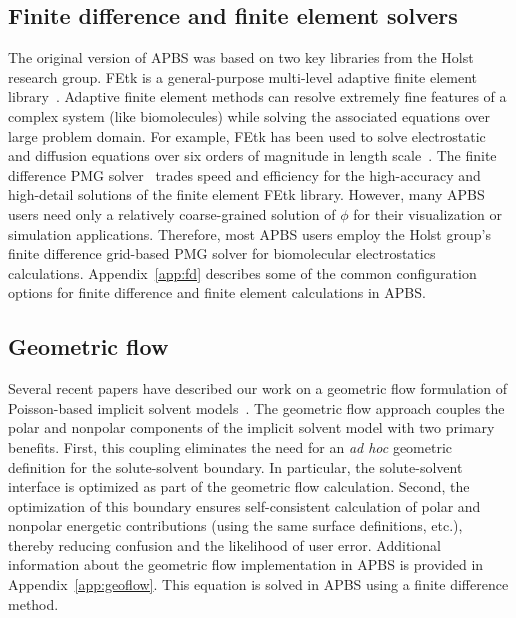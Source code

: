 \documentclass[12pt,titlepage]{article}
\begin{document}
\subsection{Finite difference and finite element solvers} \label{sec:fd}
The original version of APBS was based on two key libraries from the Holst research group.
FEtk is a general-purpose multi-level adaptive finite element library~\cite{FEtk, FEtkweb}.
Adaptive finite element methods can resolve extremely fine features of a complex system (like biomolecules) while solving the associated equations over large problem domain.
For example, FEtk has been used to solve electrostatic and diffusion equations over six orders of magnitude in length scale~\cite{Tai2003}.
The finite difference PMG solver~\cite{FEtkweb, Holst1993} trades speed and efficiency for the high-accuracy and high-detail solutions of the finite element FEtk library.
However, many APBS users need only a relatively coarse-grained solution of $\phi$ for their visualization or simulation applications.
Therefore, most APBS users employ the Holst group's finite difference grid-based PMG solver for biomolecular electrostatics calculations.
Appendix~\ref{app:fd} describes some of the common configuration options for finite difference and finite element calculations in APBS.

\subsection{Geometric flow} \label{sec:geoflow}
Several recent papers have described our work on a geometric flow formulation of Poisson-based implicit solvent models~\cite{Chen2010, Chen2011, Chen2012, Daily2013, Thomas2013}.
The geometric flow approach couples the polar and nonpolar components of the implicit solvent model with two primary benefits.
First, this coupling eliminates the need for an \textit{ad hoc} geometric definition for the solute-solvent boundary.
In particular, the solute-solvent interface is optimized as part of the geometric flow calculation.
Second, the optimization of this boundary ensures self-consistent calculation of polar and nonpolar energetic contributions (using the same surface definitions, etc.), thereby reducing confusion and the likelihood of user error.
Additional information about the geometric flow implementation in APBS is provided in Appendix~\ref{app:geoflow}.
This equation is solved in APBS using a finite difference method.
\end{document}
